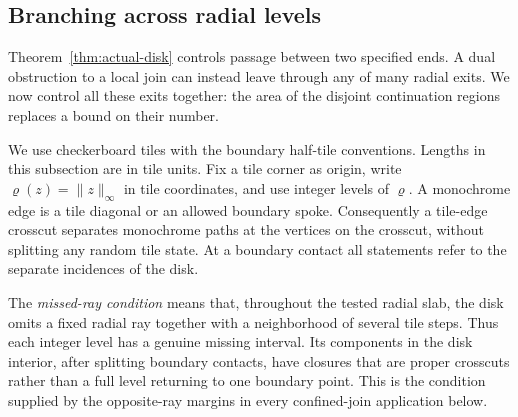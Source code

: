 \subsection{Branching across radial levels}

Theorem~\ref{thm:actual-disk} controls passage between two specified
ends. A dual obstruction to a local join can instead leave through
any of many radial exits. We now control all these exits together:
the area of the disjoint continuation regions replaces a bound on
their number.

We use checkerboard tiles with the boundary half-tile conventions.
Lengths in this subsection are in tile units.  Fix a tile corner as origin,
write $\varrho(z)=\lVert z\rVert_\infty$ in tile coordinates, and use integer
levels of $\varrho$.  A monochrome edge is a tile diagonal or an allowed
boundary spoke.  Consequently a tile-edge crosscut separates monochrome
paths at the vertices on the crosscut, without splitting any random tile
state.  At a boundary contact all statements refer to the separate
incidences of the disk.

The \emph{missed-ray condition} means that, throughout the tested radial
slab, the disk omits a fixed radial ray together with a neighborhood of
several tile steps.  Thus each integer level has a genuine missing
interval.  Its components in the disk interior, after splitting boundary
contacts, have closures that are proper crosscuts rather than a full
level returning to one boundary point.  This is the condition supplied
by the opposite-ray margins in every confined-join application below.

